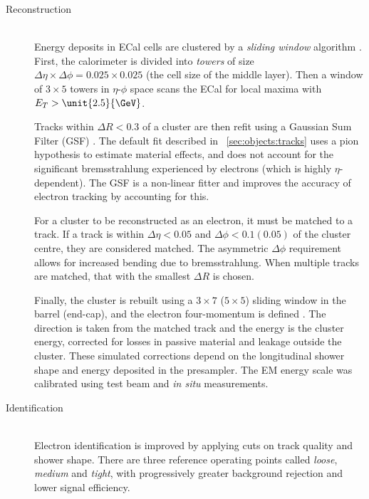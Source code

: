 \begin{description}
\item[Reconstruction] \hfill \\
	Energy deposits in \ac{ECal} cells are clustered by a \textit{sliding window} 
	algorithm \cite{ElectronPerf:Expect}. First, the calorimeter is divided into 
	\textit{towers} of size $\Delta\eta \times \Delta\phi = 0.025 \times 0.025$ (the 
	cell size of the middle layer). Then a window of $3 \times 5$ towers in $\eta$-$\phi$ 
	space scans the \ac{ECal} for local maxima with $E_T > \unit{2.5}{\GeV}$.

	Tracks within $\Delta R < 0.3$ of a cluster are then refit using a Gaussian Sum 
	Filter (GSF) \cite{Electron:GSF}. The default fit described in 
	\Section~\ref{sec:objects:tracks} uses a pion hypothesis to estimate material 
	effects, and does not account for the significant bremsstrahlung experienced by 
	electrons (which is highly $\eta$-dependent). The GSF is a non-linear fitter and 
	improves the accuracy of electron tracking by accounting for this.

	For a cluster to be reconstructed as an electron, it must be matched to a track. If a 
	track is within $\Delta\eta < 0.05$ and $\Delta\phi < 0.1 (0.05)$ of the cluster 
	centre, they are considered matched. The asymmetric $\Delta\phi$ requirement allows 
	for increased bending due to bremsstrahlung. When multiple tracks are matched, that 
	with the smallest $\Delta R$ is chosen.

	Finally, the cluster is rebuilt using a $3 \times 7$ ($5 \times 5$) sliding window 
	in the barrel (end-cap), and the electron four-momentum is defined 
	\cite{ElectronPerf:2010}. The direction is taken from the matched track and the 
	energy is the cluster energy, corrected for losses in passive material and leakage 
	outside the cluster. These simulated corrections depend on the longitudinal shower 
	shape and energy deposited in the presampler. The EM energy scale was calibrated
	using test beam and \textit{in situ} \HepProcess{\PZ \HepTo \Pe\Pe} measurements.
\item[Identification] \hfill \\
	Electron identification is improved by applying cuts on track quality and shower 
	shape. There are three reference operating points called \textit{loose}, 
	\textit{medium} and \textit{tight}, with progressively greater background rejection 
	and lower signal efficiency.
	

\end{description}
